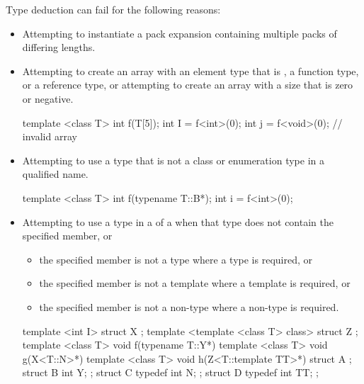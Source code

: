 \pnum
\begin{note}
Type deduction can fail for the following reasons:
\begin{itemize}
\item Attempting to instantiate a pack expansion containing multiple packs of differing lengths.
\item
Attempting to create an array with an element type that is , a
function type, or a reference type, or attempting
to create an array with a size that is zero or negative.
\begin{example}
\begin{codeblock}
template <class T> int f(T[5]);
int I = f<int>(0);
int j = f<void>(0);             // invalid array
\end{codeblock}
\end{example}
\item
Attempting to use a type that is not a class or enumeration type in a qualified name.
\begin{example}
\begin{codeblock}
template <class T> int f(typename T::B*);
int i = f<int>(0);
\end{codeblock}
\end{example}
\item
Attempting to use a type in a  of a
 when
that type does not contain the specified member, or
\begin{itemize}
\item
the specified member is not a type where a type is required, or
\item
the specified member is not a template where a template is required, or
\item
the specified member is not a non-type where a non-type is required.
\end{itemize}
\begin{example}
\begin{codeblock}
template <int I> struct X { };
template <template <class T> class> struct Z { };
template <class T> void f(typename T::Y*){}
template <class T> void g(X<T::N>*){}
template <class T> void h(Z<T::template TT>*){}
struct A {};
struct B { int Y; };
struct C {
  typedef int N;
};
struct D {
  typedef int TT;
};


\end{codeblock}
\end{example}
\end{itemize}
\end{note}
